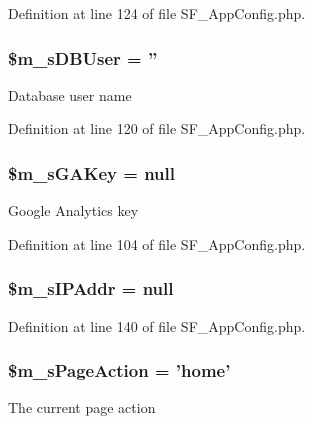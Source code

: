 Definition at line 124 of file SF\_\-AppConfig.php.

\hypertarget{classSF__AppConfig_a8dcc4e27bd3f7632d3499f555f8d4b4d}{
\subsubsection[{\$m\_\-sDBUser}]{\setlength{\rightskip}{0pt plus 5cm}\$m\_\-sDBUser = ''}}
\label{classSF__AppConfig_a8dcc4e27bd3f7632d3499f555f8d4b4d}
Database user name 

Definition at line 120 of file SF\_\-AppConfig.php.

\hypertarget{classSF__AppConfig_a450e8067b60f9369bc4370c74ea0f862}{
\subsubsection[{\$m\_\-sGAKey}]{\setlength{\rightskip}{0pt plus 5cm}\$m\_\-sGAKey = null}}
\label{classSF__AppConfig_a450e8067b60f9369bc4370c74ea0f862}
Google Analytics key 

Definition at line 104 of file SF\_\-AppConfig.php.

\hypertarget{classSF__AppConfig_a2db945fecc9d0f95e19093d7829be78d}{
\subsubsection[{\$m\_\-sIPAddr}]{\setlength{\rightskip}{0pt plus 5cm}\$m\_\-sIPAddr = null}}
\label{classSF__AppConfig_a2db945fecc9d0f95e19093d7829be78d}


Definition at line 140 of file SF\_\-AppConfig.php.

\hypertarget{classSF__AppConfig_a82cc1f3844569fa451cac5abc03b1a4d}{
\subsubsection[{\$m\_\-sPageAction}]{\setlength{\rightskip}{0pt plus 5cm}\$m\_\-sPageAction = 'home'}}
\label{classSF__AppConfig_a82cc1f3844569fa451cac5abc03b1a4d}
The current page action 

